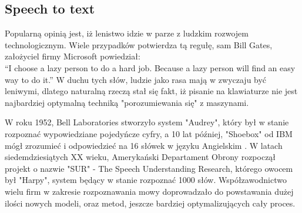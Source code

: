 \documentclass[12pt, a4paper]{article}
\begin{document}
\begin{sloppypar}
{  \subsection{Speech to text}
  {
    Popularną opinią jest, iż lenistwo idzie w parze z ludzkim rozwojem 
    technologicznym. Wiele przypadków potwierdza tą regułę, sam Bill Gates, założyciel
    firmy Microsoft powiedział:\\ 
    “I choose a lazy person to do a hard job. 
    Because a lazy person will find an easy way to do it.”
    W duchu tych słów, ludzie jako rasa mają w zwyczaju być leniwymi, dlatego
    naturalną rzeczą stał się fakt, iż pisanie na klawiaturze nie jest najbardziej 
    optymalną techniką "porozumiewania się" z maszynami.
    
    W roku 1952, Bell Laboratories stworzyło system "Audrey", który był w stanie 
    rozpoznać wypowiedziane pojedyńcze cyfry, a 10 lat później, "Shoebox" od IBM
    mógł zrozumieć i odpowiedzieć na 16 słówek w języku Angielskim \cite{speech_history}.
    W latach siedemdziesiątych XX wieku, Amerykański Departament Obrony rozpoczął
    projekt o nazwie "SUR" - The Speech Understanding Research, którego owocem
    był "Harpy", system będący w stanie rozpoznać 1000 słów. Współzawodnictwo wielu
    firm w zakresie rozpoznawania mowy doprowadzało do powstawania dużej ilości nowych
    modeli, oraz metod, jeszcze bardziej optymalizujących cały proces.

}}
\end{sloppypar}
\end{document}
